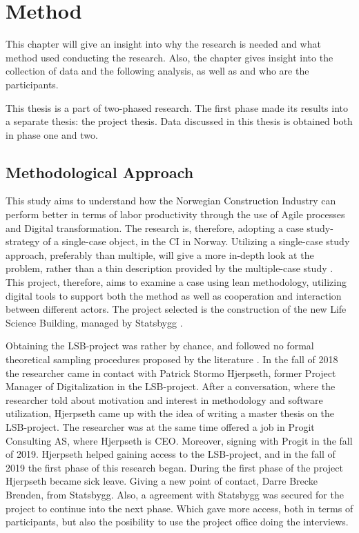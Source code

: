 
\chapter{Method} \label{chp:method}
This chapter will give an insight into why the research is needed and what method used conducting the research. Also, the chapter gives insight into the collection of data and the following analysis, as well as and who are the participants. 

This thesis is a part of two-phased research. The first phase made its results into a separate thesis: the project thesis. Data discussed in this thesis is obtained both in phase one and two. 

\section{Methodological Approach} \label{sec:purpose}
This study aims to understand how the Norwegian Construction Industry can perform better in terms of labor productivity through the use of Agile processes and Digital transformation. The research is, therefore, adopting a case study-strategy of a single-case object, in the CI in Norway. Utilizing a single-case study approach, preferably than multiple, will give a more in-depth look at the problem, rather than a thin description provided by the multiple-case study \cite{yin1993case}. This project, therefore, aims to examine a case using lean methodology, utilizing digital tools to support both the method as well as cooperation and interaction between different actors. The project selected is the construction of the new Life Science Building, managed by Statsbygg \cite{statsbygg2019uio}. 

Obtaining the LSB-project was rather by chance, and followed no formal theoretical sampling procedures proposed by the literature \cite{yin1993case}. In the fall of 2018 the researcher came in contact with Patrick Stormo Hjerpseth, former Project Manager of Digitalization in the LSB-project. After a conversation, where the researcher told about motivation and interest in methodology and software utilization, Hjerpseth came up with the idea of writing a master thesis on the LSB-project. The researcher was at the same time offered a job in Progit Consulting AS, where Hjerpseth is CEO. Moreover, signing with Progit in the fall of 2019. Hjerpseth helped gaining access to the LSB-project, and in the fall of 2019 the first phase of this research began. During the first phase of the project Hjerpseth became sick leave. Giving a new point of contact, Darre Brecke Brenden, from Statsbygg. Also, a agreement with Statsbygg was secured for the project to continue into the next phase. Which gave more access, both in terms of participants, but also the posibility to use the project office doing the interviews.    


